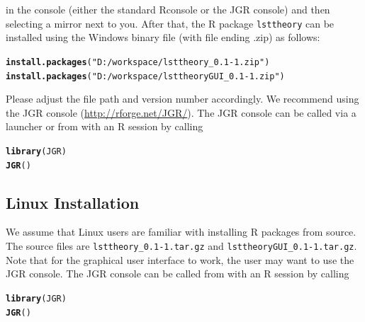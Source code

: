 \documentclass[10pt]{article}\usepackage{graphicx, color}
\makeatletter
\newcommand{\hlfunctioncall}[1]{\textcolor[rgb]{0.501960784313725,0,0.329411764705882}{\textbf{#1}}}%
\newcommand{\hlstring}[1]{\textcolor[rgb]{0.6,0.6,1}{#1}}%
\newenvironment{kframe}{%
 \def\at@end@of@kframe{}%
 \ifinner\ifhmode%
  \def\at@end@of@kframe{\end{minipage}}%
  \begin{minipage}{\columnwidth}%
 \fi\fi%
 \def\FrameCommand##1{\hskip\@totalleftmargin \hskip-\fboxsep
 \colorbox{shadecolor}{##1}\hskip-\fboxsep
     \hskip-\linewidth \hskip-\@totalleftmargin \hskip\columnwidth}%
 \MakeFramed {\advance\hsize-\width
   \@totalleftmargin\z@ \linewidth\hsize
   \@setminipage}}%
 {\par\unskip\endMakeFramed%
 \at@end@of@kframe}
\newenvironment{knitrout}{}{} %
\makeatother
\begin{document}
%
in the console (either the standard Rconsole or the JGR console) and then selecting a mirror next to you. After that, the \textsf{R} package \texttt{lsttheory} can be installed using the Windows binary file (with file ending .zip) as follows:
%
\begin{knitrout}
\color{fgcolor}\begin{kframe}
\begin{alltt}
\hlfunctioncall{install.packages}(\hlstring{"D:/workspace/lsttheory_0.1-1.zip"})
\hlfunctioncall{install.packages}(\hlstring{"D:/workspace/lsttheoryGUI_0.1-1.zip"})
\end{alltt}
\end{kframe}
\end{knitrout}

%
Please adjust the file path and version number accordingly. We recommend using the JGR console (\url{http://rforge.net/JGR/}). The JGR console can be called via a launcher or from with an R session by calling
%
\begin{knitrout}
\color{fgcolor}\begin{kframe}
\begin{alltt}
\hlfunctioncall{library}(JGR)
\hlfunctioncall{JGR}()
\end{alltt}
\end{kframe}
\end{knitrout}

%


\subsection{Linux Installation}

We assume that Linux users are familiar with installing \textsf{R} packages from source. The source files are \texttt{lsttheory\_0.1-1.tar.gz} and \texttt{lsttheoryGUI\_0.1-1.tar.gz}. Note that for the graphical user interface to work, the user may want to use the JGR console. The JGR console can be called from with an R session by calling
%
\begin{knitrout}
\color{fgcolor}\begin{kframe}
\begin{alltt}
\hlfunctioncall{library}(JGR)
\hlfunctioncall{JGR}()
\end{alltt}
\end{kframe}
\end{knitrout}
\end{document}
